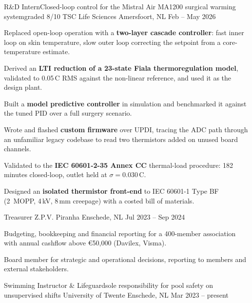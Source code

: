 \documentclass[10pt, a4paper]{awesome-cv}
\begin{document}
\begin{cventries}

\cventry
  {R\&D Intern{\enskip\cdotp\enskip}Closed-loop control for the Mistral Air MA1200 surgical warming system{\enskip\cdotp\enskip}graded 8/10}
  {TSC Life Sciences}
  {Amersfoort, NL}
  {Feb -- May 2026}
  {
    \begin{cvitems}
      \item {Replaced open-loop operation with a \textbf{two-layer cascade controller}: fast inner loop on skin temperature, slow outer loop correcting the setpoint from a core-temperature estimate.}
      \item {Derived an \textbf{LTI reduction of a 23-state Fiala thermoregulation model}, validated to 0.05\,\textdegree C RMS against the non-linear reference, and used it as the design plant.}
      \item {Built a \textbf{model predictive controller} in simulation and benchmarked it against the tuned PID over a full surgery scenario.}
      \item {Wrote and flashed \textbf{custom firmware} over UPDI, tracing the ADC path through an unfamiliar legacy codebase to read two thermistors added on unused board channels.}
      \item {Validated to the \textbf{IEC 60601-2-35 Annex CC} thermal-load procedure: 182 minutes closed-loop, outlet held at $\sigma = 0.030$\,\textdegree C.}
      \item {Designed an \textbf{isolated thermistor front-end} to IEC 60601-1 Type BF (2\texttimes\ MOPP, 4\,kV, 8\,mm creepage) with a costed bill of materials.}
    \end{cvitems}
  }

\cventry
  {Treasurer}
  {Z.P.V. Piranha}
  {Enschede, NL}
  {Jul 2023 -- Sep 2024}
  {
    \begin{cvitems}
      \item {Budgeting, bookkeeping and financial reporting for a 400-member association with annual cashflow above \euro50,000 (Davilex, Visma).}
      \item {Board member for strategic and operational decisions, reporting to members and external stakeholders.}
    \end{cvitems}
  }

\cventry
  {Swimming Instructor \& Lifeguard{\enskip\cdotp\enskip}sole responsibility for pool safety on unsupervised shifts}
  {University of Twente}
  {Enschede, NL}
  {Mar 2023 -- present}
  {}

\end{cventries}
\end{document}
